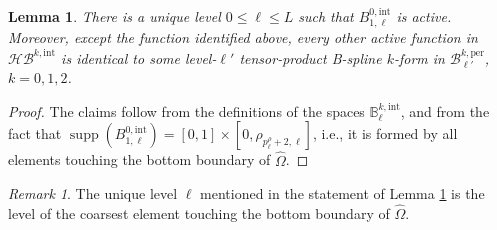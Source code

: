\documentclass[10pt]{article}
\newcommand{\mbf}[1]{{\boldsymbol{#1}}}
\DeclareMathOperator{\supp}{supp}
\newcommand{\suppwp}[1]{\supp{\left(#1\right)}}
\newcommand{\basis}[1]{\mathcal{#1}}
\newcommand{\vSpace}[1]{\mathbb{#1}}
\newcommand{\tpDomain}{\widehat{\Omega}}
\newcommand{\cU}{\theta}
\newcommand{\cV}{\rho}
\newcommand{\degV}{p^\cV}
\newcommand{\kntU}{\cU}
\newcommand{\kntV}{\cV}
\newcommand{\kntsU}{\mbf{\kntU}}
\newcommand{\kntsV}{\mbf{\kntV}}
\newcommand{\pkntsU}{\kntsU^\per}
\newcommand{\bsp}{B}
\newcommand{\bspB}{\basis{\bsp}}
\newcommand{\bspS}{\vSpace{\bsp}}
\newcommand{\tpB}[2]{\bspB^{#1}}
\newcommand{\per}{\mathrm{per}}
\newcommand{\tint}{\mathrm{int}}
\newcommand{\hBasis}[1]{\mathit{\basis{H}\basis{#1}}}
\theoremstyle{plain}
\newtheorem{lemma}{Lemma}[section]
\theoremstyle{definition}
\theoremstyle{remark}
\newtheorem{remark}{Remark}[section]
\begin{document}
\begin{lemma}\label{lem:active-intermediate-basis}
    There is a unique level $0 \leq \ell \leq L$ such that $\bsp^{0,\tint}_{1,\ell}$ is active.
    Moreover, except the function identified above, every other active function in $\hBasis{\bsp}^{k,\tint}$ is identical to some level-$\ell'$ tensor-product B-spline $k$-form in $\bspB^{k,\per}_{\ell'}$,
     $k = 0, 1, 2$.
\end{lemma}
\begin{proof}
    The claims follow from the definitions of the spaces $\bspS^{k,\tint}_\ell$, and from the fact that $\suppwp{\bsp^{0,\tint}_{1,\ell}} = [0,1] \times [0, \cV_{\degV_\ell+2, \ell}]$, i.e., it is formed by all elements touching the bottom boundary of $\tpDomain$.
\end{proof}

\begin{remark}\label{rem:unique-level}
    The unique level $\ell$ mentioned in the statement of Lemma \ref{lem:active-intermediate-basis} is the level of the coarsest element touching the bottom boundary of $\tpDomain$.
\end{remark}
\end{document}
